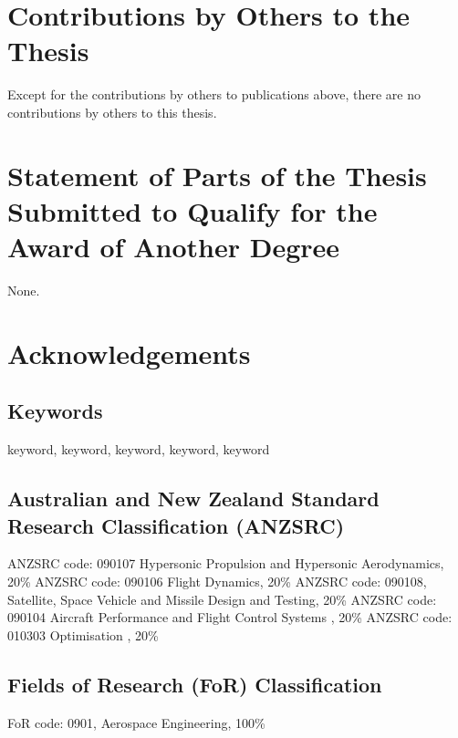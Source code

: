 \section*{Contributions by Others to the Thesis}

Except for the contributions by others to publications above, there are no contributions by others to this thesis.

\section*{Statement of Parts of the Thesis Submitted to Qualify for the Award of Another Degree}

None.

\clearpage

\section*{Acknowledgements} 
  

  \vfill


\clearpage
\subsection*{Keywords}
  keyword, keyword, keyword, keyword, keyword

\subsection*{Australian and New Zealand Standard Research Classification (ANZSRC)}

  ANZSRC code: 090107 Hypersonic Propulsion and Hypersonic Aerodynamics, 20\% \newline
 ANZSRC code: 090106 Flight Dynamics, 20\% \newline
 ANZSRC code: 090108, Satellite, Space Vehicle and Missile Design and Testing, 20\% \newline
ANZSRC code: 090104 Aircraft Performance and Flight Control Systems , 20\% \newline
ANZSRC code: 010303 Optimisation , 20\% \newline

\subsection*{Fields of Research (FoR) Classification}

  FoR code: 0901, Aerospace Engineering, 100\%

\tableofcontents

\listoffigures
{}
\listoftables
{}
\printnomenclature